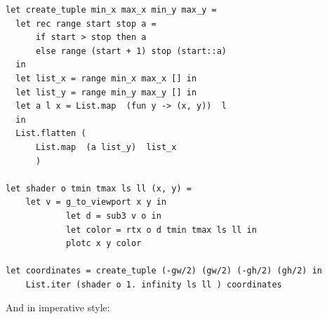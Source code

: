 \documentclass[conference]{IEEEtran}
\begin{document}
\begin{lstlisting}
let create_tuple min_x max_x min_y max_y =
  let rec range start stop a = 
      if start > stop then a
      else range (start + 1) stop (start::a)
  in 
  let list_x = range min_x max_x [] in
  let list_y = range min_y max_y [] in 
  let a l x = List.map  (fun y -> (x, y))  l
  in
  List.flatten (
      List.map  (a list_y)  list_x
      )

let shader o tmin tmax ls ll (x, y) = 
    let v = g_to_viewport x y in
            let d = sub3 v o in
            let color = rtx o d tmin tmax ls ll in 
            plotc x y color

let coordinates = create_tuple (-gw/2) (gw/2) (-gh/2) (gh/2) in 
    List.iter (shader o 1. infinity ls ll ) coordinates
\end{lstlisting}

And in imperative style:
\end{document}
